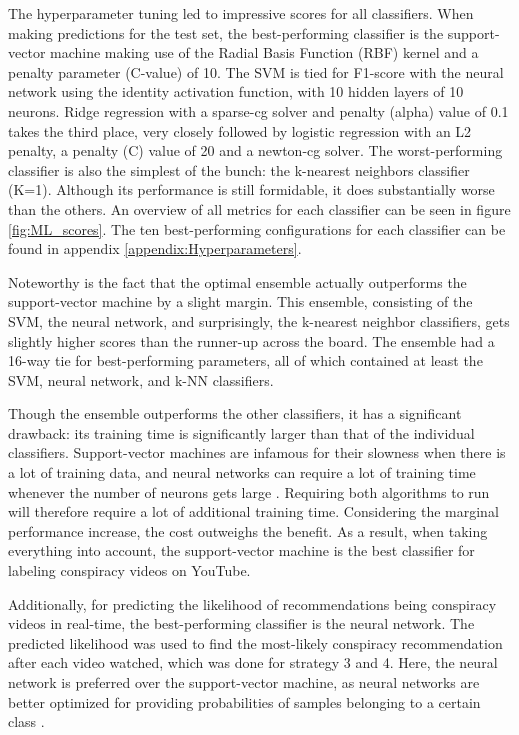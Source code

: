 \documentclass[../main.tex]{subfiles}
\begin{document}
The hyperparameter tuning led to impressive scores for all classifiers. When making predictions for the
test set, the best-performing classifier is the support-vector machine making use of the Radial Basis
Function (RBF) kernel and a penalty parameter (C-value) of 10. The SVM is tied for F1-score with the neural 
network using the identity activation function, with 10 hidden layers of 10 neurons. Ridge regression with a 
sparse-cg solver and penalty (alpha) value of 0.1 takes the third place, very closely followed by logistic 
regression with an L2 penalty, a penalty (C) value of 20 and a newton-cg solver. The worst-performing 
classifier is also the simplest of the bunch: the k-nearest neighbors classifier (K=1). Although its 
performance is still formidable, it does substantially worse than the others. An overview of all metrics for 
each classifier can be seen in figure \ref{fig:ML_scores}. The ten best-performing configurations for each
classifier can be found in appendix \ref{appendix:Hyperparameters}.

Noteworthy is the fact that the optimal ensemble actually outperforms the support-vector machine by a
slight margin. This ensemble, consisting of the SVM, the neural network, and surprisingly, the k-nearest
neighbor classifiers, gets slightly higher scores than the runner-up across the board. The ensemble had
a 16-way tie for best-performing parameters, all of which contained at least the SVM, neural network,
and k-NN classifiers. 

Though the ensemble outperforms the other classifiers, it has a significant drawback: its training time
is significantly larger than that of the individual classifiers. Support-vector machines are infamous
for their slowness when there is a lot of training data, and neural networks can require a lot of
training time whenever the number of neurons gets large \citep{burges1997improving,
kamarthi1999accelerating}. Requiring both algorithms to run will therefore require a lot of additional
training time. Considering the marginal performance increase, the cost outweighs the benefit. As a
result, when taking everything into account, the support-vector machine is the best classifier for
labeling conspiracy videos on YouTube.

Additionally, for predicting the likelihood of recommendations being conspiracy videos in real-time, the 
best-performing classifier is the neural network. The predicted likelihood was used to find the most-likely 
conspiracy recommendation after each video watched, which was done for strategy 3 and 4. Here, the neural 
network is preferred over the support-vector machine, as neural networks are better optimized for providing 
probabilities of samples belonging to a certain class \citep{specht1990probabilistic}.
\end{document}
